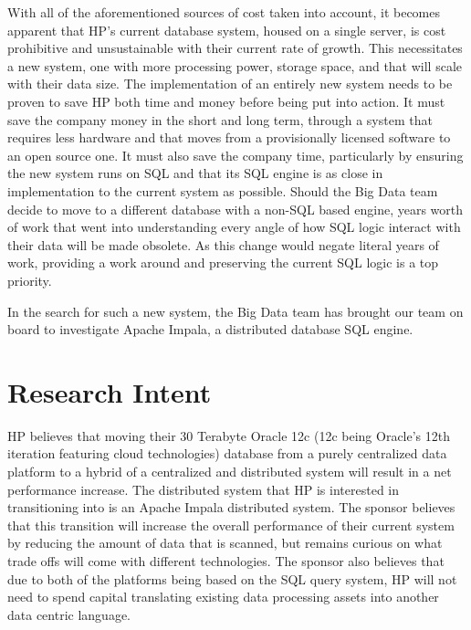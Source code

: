 \documentclass[onecolumn, draftclsnofoot,10pt, compsoc]{IEEEtran}
\begin{document}
 With all of the aforementioned sources of cost taken into account, it becomes apparent that HP’s current database system, housed on a single server, is cost prohibitive and unsustainable with their current rate of growth. This necessitates a new system, one with more processing power, storage space, and that will scale with their data size. The implementation of an entirely new system needs to be proven to save HP both time and money before being put into action. It must save the company money in the short and long term, through a system that requires less hardware and that moves from a provisionally licensed software to an open source one. It must also save the company time, particularly by ensuring the new system runs on SQL and that its SQL engine is as close in implementation to the current system as possible. Should the Big Data team decide to move to a different database with a non-SQL based engine, years worth of work that went into understanding every angle of how SQL logic interact with their data will be made obsolete. As this change would negate literal years of work, providing a work around and preserving the current SQL logic is a top priority.


In the search for such a new system, the Big Data team has brought our team on board to investigate Apache Impala, a distributed database SQL engine.



\section{Research Intent}
HP believes that moving their 30 Terabyte Oracle 12c (12c being Oracle’s 12th iteration featuring cloud technologies) database from a purely centralized data platform to a hybrid of a centralized and distributed system will result in a net performance increase. The distributed system that HP is interested in transitioning into is an Apache Impala distributed system. The sponsor believes that this transition will increase the overall performance of their current system by reducing the amount of data that is scanned, but remains curious on what trade offs will come with different technologies. The sponsor also believes that due to both of the platforms being based on the SQL query system, HP will not need to spend capital translating existing data processing assets into another data centric language.
\end{document}
